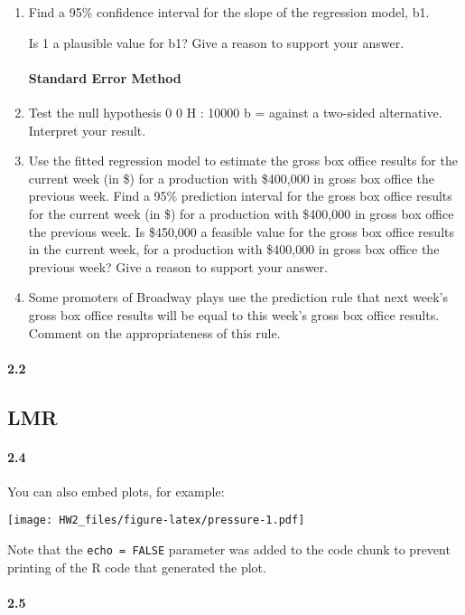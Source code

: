 \documentclass[
]{article}
\begin{document}
\begin{enumerate}
\def\labelenumi{\arabic{enumi}.}
\item
  Find a 95\% confidence interval for the slope of the regression model,
  b1.

  Is 1 a plausible value for b1? Give a reason to support your answer.

  \hypertarget{standard-error-method}{%
  \paragraph{Standard Error Method}\label{standard-error-method}}
\item
  Test the null hypothesis 0 0 H : 10000 b = against a two-sided
  alternative. Interpret your result.
\item
  Use the fitted regression model to estimate the gross box office
  results for the current week (in \$) for a production with \$400,000
  in gross box office the previous week. Find a 95\% prediction interval
  for the gross box office results for the current week (in \$) for a
  production with \$400,000 in gross box office the previous week. Is
  \$450,000 a feasible value for the gross box office results in the
  current week, for a production with \$400,000 in gross box office the
  previous week? Give a reason to support your answer.
\item
  Some promoters of Broadway plays use the prediction rule that next
  week's gross box office results will be equal to this week's gross box
  office results. Comment on the appropriateness of this rule.
\end{enumerate}

\hypertarget{section-1}{%
\paragraph{2.2}\label{section-1}}

\hypertarget{lmr}{%
\subsection{LMR}\label{lmr}}

\hypertarget{section-2}{%
\paragraph{2.4}\label{section-2}}

You can also embed plots, for example:

\texttt{[image: HW2\_files/figure-latex/pressure-1.pdf]}

Note that the \texttt{echo\ =\ FALSE} parameter was added to the code
chunk to prevent printing of the R code that generated the plot.

\hypertarget{section-3}{%
\paragraph{2.5}\label{section-3}}
\end{document}
